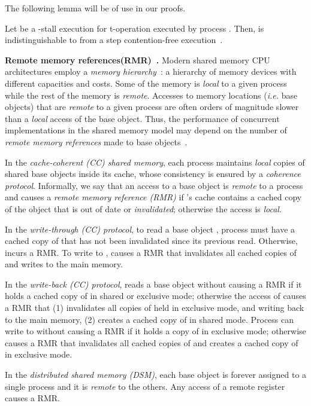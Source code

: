 The following lemma will be of use in our proofs.
\begin{lemma}
\label{lm:stalls}
Let  be a -stall execution for t-operation  executed by process .
Then,  is indistinguishable to  from a step contention-free execution~\cite{AGHK09}.
\end{lemma}
\vspace{1mm}\noindent\textbf{Remote memory references(RMR)~\cite{rmr-mutex}.}
Modern shared memory CPU architectures employ a \emph{memory hierarchy}~\cite{hennessy-patterson}:
a hierarchy of memory devices with different capacities and costs.
Some of the memory is \emph{local} to a given process while the rest of the memory is \emph{remote}.
Accesses to memory locations (\emph{i.e.} base objects) that are \emph{remote} to a given process
are often orders of magnitude slower than a \emph{local} access of the base object.
Thus, the performance of concurrent implementations in the shared memory model may depend on the number
of \emph{remote memory references} made to base objects~\cite{anderson-90-tpds}.

In the \emph{cache-coherent (CC) shared memory}, each process maintains \emph{local}
copies of shared base objects inside its cache, whose consistency is ensured by a \emph{coherence protocol}.
Informally, we say that an access to a base object  is \emph{remote} to a process  and 
causes a \emph{remote memory reference (RMR)} if 's cache contains a 
cached copy of the object that is out of date or \emph{invalidated}; otherwise the access is \emph{local}.

In the \emph{write-through (CC) protocol}, to read a base object , process  must have a cached copy of  that
has not been invalidated since its previous read. Otherwise,  incurs a RMR. 
To write to ,  causes a RMR that invalidates all cached copies
of  and writes to the main memory.

In the \emph{write-back (CC) protocol},  reads a base object  without causing a RMR if it holds a cached copy of 
in shared or exclusive mode; otherwise the access of  causes a RMR that (1) 
invalidates all copies of  held in exclusive mode, and writing  back to the main memory,
(2) creates a cached copy of  in shared mode.
Process  can write to  without causing a RMR if it holds a copy of  in exclusive mode; otherwise
 causes a RMR that invalidates all cached copies of  and creates a cached copy of  in exclusive mode.

In the \emph{distributed shared memory (DSM)}, each base object is forever assigned to a single process and it is
\emph{remote} to the others. Any access of a remote register causes a RMR.
%
